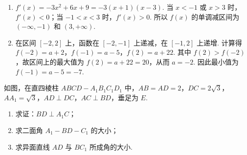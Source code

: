 \begin{solution}
\begin{enumerate}
\item \(f'(x)=-3x^2+6x+9=-3(x+1)(x-3)\). 当 \(x<-1\) 或 \(x>3\) 时，\(f'(x)<0\)；当 \(-1<x<3\) 时，\(f'(x)>0\). 所以 \(f(x)\) 的单调减区间为 \(\left(-\infty,-1\right)\) 和 \(\left(3,+\infty\right)\).

\item 在区间 \(\left[-2,2\right]\) 上，函数在 \(\left[-2,-1\right]\) 上递减，在 \(\left[-1,2\right]\) 上递增. 计算得 \(f(-2)=a+2\)，\(f(-1)=a-5\)，\(f(2)=a+22\).
其中 \(f(2)>f(-2)\)，故区间上的最大值为 \(f(2)=a+22=20\)，从而 \(a=-2\). 因此最小值为 \(f(-1)=a-5=-7\).
\end{enumerate}
\end{solution}

\begin{problem}
如图，在直四棱柱 \(ABCD-A_{1}B_{1}C_{1}D_{1}\) 中，\(AB=AD=2\)，\(DC=2\sqrt{3}\)，\(AA_1=\sqrt{3}\)，\(AD\perp DC\)，\(AC\perp BD\)，垂足为 \(E\).

\begin{enumerate}
\item 求证：\(BD\perp A_1C\)；
\item 求二面角 \(A_1-BD-C_1\) 的大小；
\item 求异面直线 \(AD\) 与 \(BC_1\) 所成角的大小.
\end{enumerate}

\end{problem}

